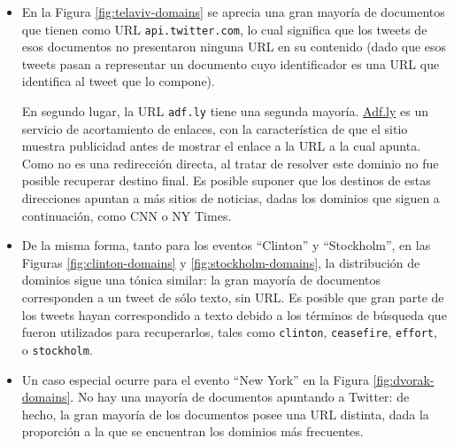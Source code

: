 \documentclass[upright, contnum]{umemoria}
\begin{document}
\begin{itemize}
\item En la Figura \ref{fig:telaviv-domains} se aprecia una gran
      mayoría de documentos que tienen como URL \texttt{api.twitter.com}, lo
      cual significa que los tweets de esos documentos no presentaron
      ninguna URL en su contenido (dado que esos tweets pasan a
      representar un documento cuyo identificador es una URL que
      identifica al tweet que lo compone). 

      En segundo lugar, la URL \texttt{adf.ly} tiene una segunda
      mayoría. \hyperref[sec-4.4.1]{Adf.ly} es un servicio de acortamiento de enlaces, con
      la característica de que el sitio muestra publicidad antes de
      mostrar el enlace a la URL a la cual apunta. Como no es una
      redirección directa, al tratar de resolver este dominio no fue
      posible recuperar destino final. Es posible suponer que los
      destinos de estas direcciones apuntan a más sitios de noticias,
      dadas los dominios que siguen a continuación, como CNN o NY
      Times.
\item De la misma forma, tanto para los eventos ``Clinton'' y
      ``Stockholm'', en las Figuras \ref{fig:clinton-domains} y
      \ref{fig:stockholm-domains}, la distribución de dominios sigue una tónica
      similar: la gran mayoría de documentos corresponden a un tweet
      de sólo texto, sin URL. Es posible que gran parte de los tweets
      hayan correspondido a texto debido a los términos de búsqueda
      que fueron utilizados para recuperarlos, tales como \texttt{clinton},
      \texttt{ceasefire}, \texttt{effort}, o \texttt{stockholm}.
\item Un caso especial ocurre para el evento ``New York'' en la Figura
      \ref{fig:dvorak-domains}. No hay una mayoría de documentos
      apuntando a Twitter: de hecho, la gran mayoría de los documentos
      posee una URL distinta, dada la proporción a la que se
      encuentran los dominios más frecuentes.
\end{itemize}
\end{document}
